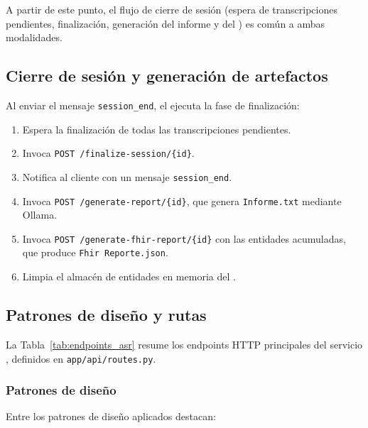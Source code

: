 A partir de este punto, el flujo de cierre de sesión (espera de transcripciones pendientes,
finalización, generación del informe  y del  )
es común a ambas modalidades.

\subsection{Cierre de sesión y generación de artefactos}\label{subsection:cierre_sesion}

Al enviar el mensaje \texttt{session\_end}, el  ejecuta la fase de
finalización:

\begin{enumerate}
    \item Espera la finalización de todas las transcripciones pendientes.
    \item Invoca \texttt{POST /finalize-session/\{id\}}.
    \item Notifica al cliente con un mensaje \texttt{session\_end}.
    \item Invoca \texttt{POST /generate-report/\{id\}}, que genera \texttt{Informe.txt} mediante
    Ollama.
    \item Invoca \texttt{POST /generate-fhir-report/\{id\}} con las entidades acumuladas, que
    produce \texttt{Fhir Reporte.json}.
    \item Limpia el almacén de entidades en memoria del .
\end{enumerate}

\subsection{Patrones de diseño y rutas}\label{subsection:patrones_configuracion}

La Tabla~\ref{tab:endpoints_asr} resume los endpoints HTTP principales del servicio ,
definidos en \texttt{app/api/routes.py}.



\subsubsection{Patrones de diseño}\label{subsubsection:patrones_diseno}

Entre los patrones de diseño aplicados destacan:


